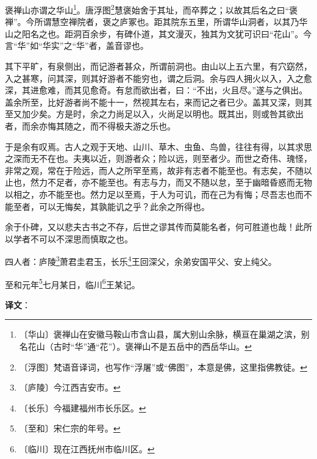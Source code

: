 \documentclass[12pt,UTF-8,openany,a4]{ctexbook}
\begin{document}
\begin{large}
    
    褒禅山亦谓之华山\footnote{〔华山〕\yiwen 褒禅山在安徽马鞍山市含山县，属大别山余脉，横亘在巢湖之滨，别名花山（古时“华”通“花”）。褒禅山不是五岳中的西岳华山。}。唐浮图\footnote{〔浮图〕\yiwen 梵语音译词，也写作“浮屠”或“佛图”，本意是佛，这里指佛教徒。}慧褒始舍于其址，而卒葬之；以故其后名之曰“褒禅”。今所谓慧空禅院者，褒之庐冢也。距其院东五里，所谓华山洞者，以其乃华山之阳名之也。距洞百余步，有碑仆道，其文漫灭，独其为文犹可识曰“花山”。今言“华”如“华实”之“华”者，盖音谬也。
    
    其下平旷，有泉侧出，而记游者甚众，所谓前洞也。由山以上五六里，有穴窈然，入之甚寒，问其深，则其好游者不能穷也，谓之后洞。余与四人拥火以入，入之愈深，其进愈难，而其见愈奇。有怠而欲出者，曰：“不出，火且尽。”遂与之俱出。盖余所至，比好游者尚不能十一，然视其左右，来而记之者已少。盖其又深，则其至又加少矣。方是时，余之力尚足以入，火尚足以明也。既其出，则或咎其欲出者，而余亦悔其随之，而不得极夫游之乐也。
    
    于是余有叹焉。古人之观于天地、山川、草木、虫鱼、鸟兽，往往有得，以其求思之深而无不在也。夫夷以近，则游者众；险以远，则至者少。而世之奇伟、瑰怪，非常之观，常在于险远，而人之所罕至焉，故非有志者不能至也。有志矣，不随以止也，然力不足者，亦不能至也。有志与力，而又不随以怠，至于幽暗昏惑而无物以相之，亦不能至也。然力足以至焉，于人为可讥，而在己为有悔；尽吾志也而不能至者，可以无悔矣，其孰能讥之乎？此余之所得也。
    
    余于仆碑，又以悲夫古书之不存，后世之谬其传而莫能名者，何可胜道也哉！此所以学者不可以不深思而慎取之也。
    
    四人者：庐陵\footnote{〔庐陵〕\yiwen 今江西吉安市。}萧君圭君玉，长乐\footnote{〔长乐〕\yiwen 今福建福州市长乐区。}王回深父，余弟安国平父、安上纯父。
    
    至和元年\footnote{〔至和〕\yiwen 宋仁宗的年号。}七月某日，临川\footnote{〔临川〕\yiwen 现在江西抚州市临川区。}王某记。

\end{large}


\newpage

\begin{Large}
   \noindent \textbf{译文}：
\end{Large}

\vspace{1em}
\end{document}
